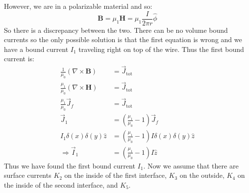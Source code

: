 \documentclass[a4paper, 11pt]{article}
\begin{document}
However, we are in a polarizable material and so: 
	\begin{equation}
		\mathbf{B} = \mu_1 \mathbf{H} = \mu_1 \frac{I}{2\pi r}\hat{\phi} 
	\end{equation}
So there is a discrepancy between the two. There can be no volume bound currents so the only possible solution is that the first equation is wrong and we have a bound current $I_1$ traveling right on top of the wire. Thus the first bound current is:
	\begin{align*}
		\frac{1}{\mu_0}(\nabla \times \mathbf{B}) &= \vec{J}_{\text{tot}} \\ 
		\frac{\mu_1}{\mu_0}(\nabla \times \mathbf{H}) &= \vec{J}_{\text{tot}} \\ 
		\frac{\mu_1}{\mu_0}\vec{J}_f &= \vec{J}_{\text{tot}} \\ 
		\vec{J}_1 &= (\frac{\mu_1}{\mu_0}-1)\vec{J}_f \\ 
		I_1\delta(x)\delta(y)\hat{z} &= (\frac{\mu_1}{\mu_0}-1)I\delta(x)\delta(y)\hat{z} \\ 
		\Rightarrow \vec{I}_1 &= (\frac{\mu_1}{\mu_0}-1)I \hat{z} 
	\end{align*}
Thus we have found the first bound current $I_1$. Now we assume that there are surface currents $K_2$ on the inside of the first interface, $K_3$ on the outside, $K_4$ on the inside of the second interface, and $K_5$. \\ 
\end{document}
